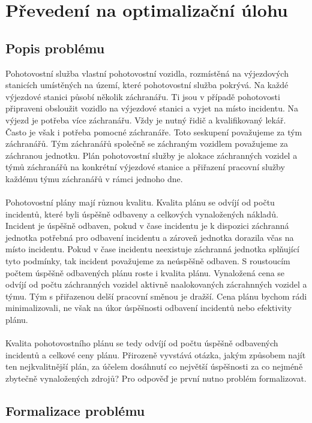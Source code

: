 \chapter{Převedení na optimalizační úlohu}

\section{Popis problému}

Pohotovostní služba vlastní pohotovostní vozidla, rozmístěná na výjezdových stanicích umístěných na území, které pohotovostní služba pokrývá.
Na každé výjezdové stanici působí několik záchranářu. Ti jsou v případě pohotovosti připraveni obsloužit vozidlo na výjezdové stanici a vyjet na místo incidentu.
Na výjezd je potřeba více záchranářu. Vždy je nutný řidič a kvalifikovaný lekář. Často je však i potřeba pomocné záchranáře.
Toto seskupení považujeme za tým záchranářů.
Tým záchranářů společně se záchraným vozidlem považujeme za záchranou jednotku.
Plán pohotovostní služby je alokace záchranných vozidel a týmů záchranářů na konkrétní výjezdové stanice a přiřazení pracovní služby každému týmu záchranářů v rámci jednoho dne.
\\\\
Pohotovostní plány mají různou kvalitu. Kvalita plánu se odvíjí od počtu incidentů, které byli úspěšně odbaveny a celkových vynaložených nákladů.
Incident je úspěšně odbaven, pokud v čase incidentu je k dispozici záchranná jednotka potřebná pro odbavení incidentu a zároveň jednotka dorazila včas na místo incidentu.
Pokud v čase incidentu neexistuje záchranná jednotka splňující tyto podmínky, tak incident považujeme za neúspěšně odbaven.
S roustoucím počtem úspěšně odbavených plánu roste i kvalita plánu.
Vynaložená cena se odvíjí od počtu záchranných vozidel aktivně naalokovaných zácrahnných vozidel a týmu. Tým s přiřazenou delší pracovní směnou je dražší.
Cena plánu bychom rádi minimalizovali, ne však na úkor úspěšnosti odbavení incidentů nebo efektivity plánu.
\\\\
Kvalita pohotovostního plánu se tedy odvíjí od počtu úspěšně odbavených incidentů a celkové ceny plánu.
Přirozeně vyvstává otázka, jakým způsobem najít ten nejkvalitnější plán, za účelem dosáhnutí co největší úspěšnosti za co nejméně zbytečně vynaložených zdrojů? 
Pro odpověď je první nutno problém formalizovat.

\clearpage

\section{Formalizace problému}

